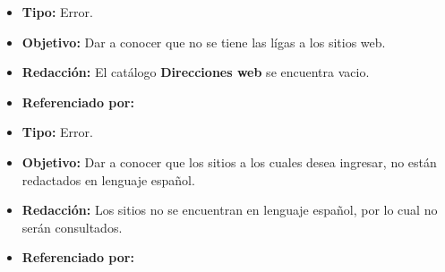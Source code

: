   
    \begin{itemize}
      \item \textbf{Tipo:} Error. 
      \item \textbf{Objetivo:}  Dar a conocer que no se tiene las lígas a los sitios web.
      \item \textbf{Redacción:} El catálogo \textbf{Direcciones web} se encuentra vacio.
      \item \textbf{Referenciado por:} \\
    \end{itemize}

    \begin{itemize}
      \item \textbf{Tipo:} Error. 
      \item \textbf{Objetivo:}  Dar a conocer que los sitios a los cuales desea ingresar, no están redactados en lenguaje español.
      \item \textbf{Redacción:} Los sitios no se encuentran en lenguaje español, por lo cual no serán consultados.
      \item \textbf{Referenciado por:} \\
    \end{itemize}